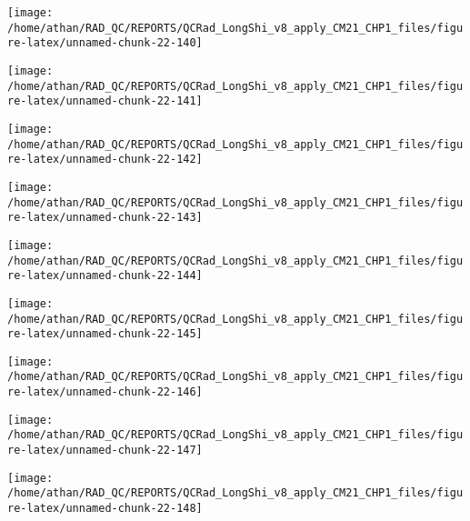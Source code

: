 \documentclass[
  10pt,
  a4paper,oneside]{article}
\begin{document}
\begin{center}\texttt{[image: /home/athan/RAD\_QC/REPORTS/QCRad\_LongShi\_v8\_apply\_CM21\_CHP1\_files/figure-latex/unnamed-chunk-22-140]} \end{center}

\begin{center}\texttt{[image: /home/athan/RAD\_QC/REPORTS/QCRad\_LongShi\_v8\_apply\_CM21\_CHP1\_files/figure-latex/unnamed-chunk-22-141]} \end{center}

\begin{center}\texttt{[image: /home/athan/RAD\_QC/REPORTS/QCRad\_LongShi\_v8\_apply\_CM21\_CHP1\_files/figure-latex/unnamed-chunk-22-142]} \end{center}

\begin{center}\texttt{[image: /home/athan/RAD\_QC/REPORTS/QCRad\_LongShi\_v8\_apply\_CM21\_CHP1\_files/figure-latex/unnamed-chunk-22-143]} \end{center}

\begin{center}\texttt{[image: /home/athan/RAD\_QC/REPORTS/QCRad\_LongShi\_v8\_apply\_CM21\_CHP1\_files/figure-latex/unnamed-chunk-22-144]} \end{center}

\begin{center}\texttt{[image: /home/athan/RAD\_QC/REPORTS/QCRad\_LongShi\_v8\_apply\_CM21\_CHP1\_files/figure-latex/unnamed-chunk-22-145]} \end{center}

\begin{center}\texttt{[image: /home/athan/RAD\_QC/REPORTS/QCRad\_LongShi\_v8\_apply\_CM21\_CHP1\_files/figure-latex/unnamed-chunk-22-146]} \end{center}

\begin{center}\texttt{[image: /home/athan/RAD\_QC/REPORTS/QCRad\_LongShi\_v8\_apply\_CM21\_CHP1\_files/figure-latex/unnamed-chunk-22-147]} \end{center}

\begin{center}\texttt{[image: /home/athan/RAD\_QC/REPORTS/QCRad\_LongShi\_v8\_apply\_CM21\_CHP1\_files/figure-latex/unnamed-chunk-22-148]} \end{center}
\end{document}
